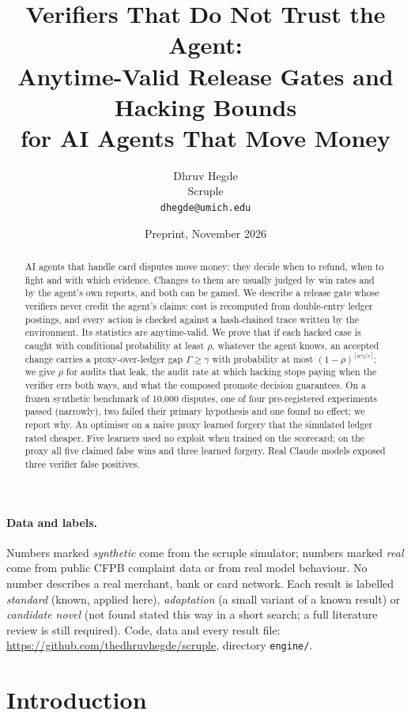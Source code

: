 \documentclass[11pt]{article}
\title{Verifiers That Do Not Trust the Agent:\\ Anytime-Valid Release Gates and Hacking Bounds\\ for AI Agents That Move Money}
\author{Dhruv Hegde\\ {\normalsize Scruple}\\ {\normalsize\texttt{dhegde@umich.edu}}}
\date{Preprint, November 2026}
\theoremstyle{definition}
\theoremstyle{remark}
\newcommand{\1}{\mathbf{1}}
\newcommand{\eps}{\varepsilon}
\begin{document}
\maketitle

\begin{abstract}
AI agents that handle card disputes move money: they decide when to refund, when to fight and with which evidence. Changes to them are usually judged by win rates and by the agent's own reports, and both can be gamed. We describe a release gate whose verifiers never credit the agent's claims: cost is recomputed from double-entry ledger postings, and every action is checked against a hash-chained trace written by the environment. Its statistics are anytime-valid. We prove that if each hacked case is caught with conditional probability at least $\rho$, whatever the agent knows, an accepted change carries a proxy-over-ledger gap $\Gamma\ge\gamma$ with probability at most $(1-\rho)^{\lceil n\gamma/\eps\rceil}$; we give $\rho$ for audits that leak, the audit rate at which hacking stops paying when the verifier errs both ways, and what the composed promote decision guarantees. On a frozen synthetic benchmark of 10{,}000 disputes, one of four pre-registered experiments passed (narrowly), two failed their primary hypothesis and one found no effect; we report why. An optimiser on a naive proxy learned forgery that the simulated ledger rated cheaper. Five learners used no exploit when trained on the scorecard; on the proxy all five claimed false wins and three learned forgery. Real Claude models exposed three verifier false positives.
\end{abstract}

\paragraph{Data and labels.} Numbers marked \emph{synthetic} come from the scruple simulator; numbers marked \emph{real} come from public CFPB complaint data or from real model behaviour. No number describes a real merchant, bank or card network. Each result is labelled \emph{standard} (known, applied here), \emph{adaptation} (a small variant of a known result) or \emph{candidate novel} (not found stated this way in a short search; a full literature review is still required). Code, data and every result file: \url{https://github.com/thedhruvhegde/scruple}, directory \texttt{engine/}.

\section{Introduction}
\end{document}
